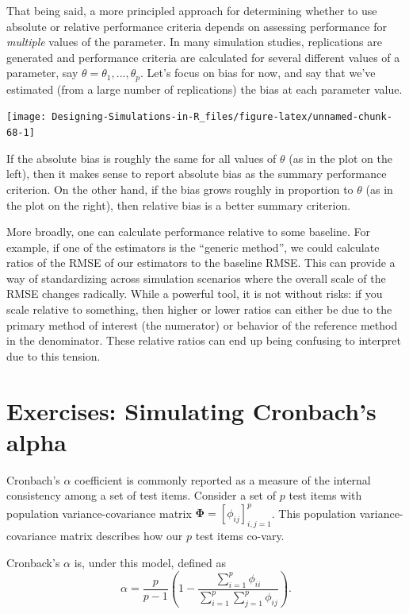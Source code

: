 \documentclass[
]{book}
\begin{document}
That being said, a more principled approach for determining whether to use absolute or relative performance criteria depends on assessing performance for \emph{multiple} values of the parameter. In many simulation studies, replications are generated and performance criteria are calculated for several different values of a parameter, say \(\theta = \theta_1,...,\theta_p\).
Let's focus on bias for now, and say that we've estimated (from a large number of replications) the bias at each parameter value.

\begin{center}\texttt{[image: Designing-Simulations-in-R\_files/figure-latex/unnamed-chunk-68-1]} \end{center}

If the absolute bias is roughly the same for all values of \(\theta\) (as in the plot on the left), then it makes sense to report absolute bias as the summary performance criterion. On the other hand, if the bias grows roughly in proportion to \(\theta\) (as in the plot on the right), then relative bias is a better summary criterion.

More broadly, one can calculate performance relative to some baseline.
For example, if one of the estimators is the ``generic method'', we could calculate ratios of the RMSE of our estimators to the baseline RMSE.
This can provide a way of standardizing across simulation scenarios where the overall scale of the RMSE changes radically.
While a powerful tool, it is not without risks: if you scale relative to something, then higher or lower ratios can either be due to the primary method of interest (the numerator) or behavior of the reference method in the denominator.
These relative ratios can end up being confusing to interpret due to this tension.

\hypertarget{exercises-simulating-cronbachs-alpha}{%
\section{Exercises: Simulating Cronbach's alpha}\label{exercises-simulating-cronbachs-alpha}}

Cronbach's \(\alpha\) coefficient is commonly reported as a measure of the internal consistency among a set of test items. Consider a set of \(p\) test items with population variance-covariance matrix \(\boldsymbol\Phi = \left[\phi_{ij}\right]_{i,j=1}^p\).
This population variance-covariance matrix describes how our \(p\) test items co-vary.

Cronback's \(\alpha\) is, under this model, defined as
\[
\alpha = \frac{p}{p - 1}\left(1 - \frac{\sum_{i=1}^p \phi_{ii}}{\sum_{i=1}^p \sum_{j=1}^p \phi_{ij}}\right).
\]
\end{document}
